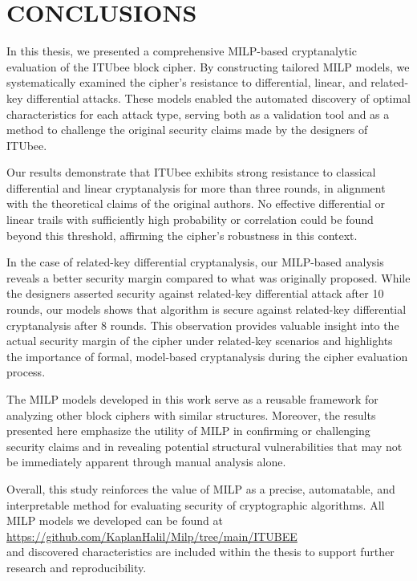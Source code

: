 \chapter{CONCLUSIONS}\label{ch:ch6}

In this thesis, we presented a comprehensive MILP-based cryptanalytic evaluation of the ITUbee block cipher. By constructing tailored MILP models, we systematically examined the cipher's resistance to differential, linear, and related-key differential attacks. These models enabled the automated discovery of optimal characteristics for each attack type, serving both as a validation tool and as a method to challenge the original security claims made by the designers of ITUbee.

Our results demonstrate that ITUbee exhibits strong resistance to classical differential and linear cryptanalysis for more than three rounds, in alignment with the theoretical claims of the original authors. No effective differential or linear trails with sufficiently high probability or correlation could be found beyond this threshold, affirming the cipher’s robustness in this context.

In the case of related-key differential cryptanalysis, our MILP-based analysis reveals a better security margin compared to what was originally proposed. While the designers asserted security against related-key differential attack after 10 rounds, our models shows that algorithm is secure against related-key differential cryptanalysis after 8 rounds. This observation provides valuable insight into the actual security margin of the cipher under related-key scenarios and highlights the importance of formal, model-based cryptanalysis during the cipher evaluation process.

The MILP models developed in this work serve as a reusable framework for analyzing other block ciphers with similar structures. Moreover, the results presented here emphasize the utility of MILP in confirming or challenging security claims and in revealing potential structural vulnerabilities that may not be immediately apparent through manual analysis alone.

Overall, this study reinforces the value of MILP as a precise, automatable, and interpretable method for evaluating security of  cryptographic algorithms. All MILP models we developed can be found at \\
\url{https://github.com/KaplanHalil/Milp/tree/main/ITUBEE} \\
and discovered characteristics are included within the thesis  to support further research and reproducibility.


